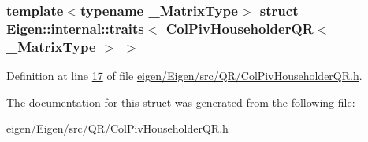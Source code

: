 \subsubsection*{template$<$typename \+\_\+\+Matrix\+Type$>$\newline
struct Eigen\+::internal\+::traits$<$ Col\+Piv\+Householder\+Q\+R$<$ \+\_\+\+Matrix\+Type $>$ $>$}



Definition at line \hyperlink{eigen_2_eigen_2src_2_q_r_2_col_piv_householder_q_r_8h_source_l00017}{17} of file \hyperlink{eigen_2_eigen_2src_2_q_r_2_col_piv_householder_q_r_8h_source}{eigen/\+Eigen/src/\+Q\+R/\+Col\+Piv\+Householder\+Q\+R.\+h}.



The documentation for this struct was generated from the following file\+:\begin{DoxyCompactItemize}
\item 
eigen/\+Eigen/src/\+Q\+R/\+Col\+Piv\+Householder\+Q\+R.\+h\end{DoxyCompactItemize}
